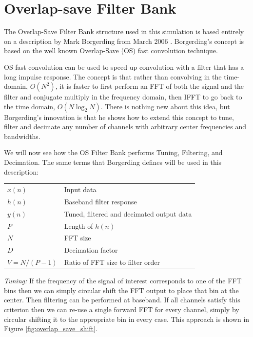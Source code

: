 \documentclass[12pt]{report}
\begin{document}

\section{Overlap-save Filter Bank}
\label{sec:os_filter_bank}
The Overlap-Save Filter Bank structure used in this simulation is based
entirely on a description by Mark Borgerding from March 2006
\cite{Borgerding1}.  Borgerding's concept is based on the well known
Overlap-Save (OS) fast convolution technique.

OS fast convolution can be used to speed up convolution with
a filter that has a long impulse response. The concept is that rather than
convolving in the time-domain, $O(N^2)$, it is faster to first
perform an FFT of both the signal and the filter and conjugate multiply in the
frequency domain, then IFFT to go back to the time domain, $O(N\log_2N)$.
There is nothing new about this idea, but Borgerding's innovation is that he
shows how to extend this concept to tune, filter and decimate any number of
channels with arbitrary center frequencies and bandwidths.

We will now see how the OS Filter Bank performs Tuning, Filtering, and
Decimation. The same terms that Borgerding defines will be used in this
description:

\begin{center}
\begin{tabular}{ll}
    $x(n)$        & Input data \\
    $h(n)$        & Baseband filter response \\
    $y(n)$        & Tuned, filtered and decimated output data \\
    $P$           & Length of $h(n)$ \\
    $N$           & FFT size \\
    $D$           & Decimation factor \\
    $V = N/(P-1)$ & Ratio of FFT size to filter order \\
\end{tabular}
\end{center}

\emph{Tuning:} If the frequency of the signal of interest corresponds to one of
the FFT bins then we can simply circular shift the FFT output to place that bin
at the center. Then filtering can be performed at baseband.  If all channels
satisfy this criterion then we can re-use a single forward FFT for every
channel, simply by circular shifting it to the appropriate bin in every case. 
This approach is shown in Figure \ref{fig:overlap_save_shift}.
\end{document}
